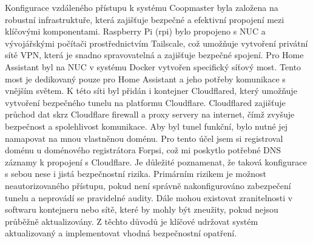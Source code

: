 Konfigurace vzdáleného přístupu k systému Coopmaster byla založena na robustní infrastruktuře, která zajišťuje bezpečné a efektivní propojení mezi klíčovými komponentami.
Raspberry Pi (rpi) bylo propojeno s NUC a vývojářskými počítači prostřednictvím Tailscale, což umožňuje vytvoření privátní sítě VPN, která je snadno spravovatelná a zajišťuje bezpečné spojení.
\newline
Pro Home Assistant byl na NUC v systému Docker vytvořen specifický síťový most.
Tento most je dedikovaný pouze pro Home Assistant a jeho potřeby komunikace s vnějším světem.
K této síti byl přidán i kontejner Cloudflared, který umožňuje vytvoření bezpečného tunelu na platformu Cloudflare.
Cloudflared zajišťuje průchod dat skrz Cloudflare firewall a proxy servery na internet, čímž zvyšuje bezpečnost a spolehlivost komunikace.
\newline
Aby byl tunel funkční, bylo nutné jej namapovat na mnou vlastněnou doménu.
Pro tento účel jsem si registroval doménu u doménového registrátora Forpsi, což mi poskytlo potřebné DNS záznamy k propojení s Cloudflare.
\newline
Je důležité poznamenat, že taková konfigurace s sebou nese i jistá bezpečnostní rizika.
Primárním rizikem je možnost neautorizovaného přístupu, pokud není správně nakonfigurováno zabezpečení tunelu a neprovádí se pravidelné audity.
Dále mohou existovat zranitelnosti v softwaru kontejneru nebo sítě, které by mohly být zneužity, pokud nejsou průběžně aktualizovány.
Z těchto důvodů je klíčové udržovat systém aktualizovaný a implementovat vhodná bezpečnostní opatření.

\newpage

